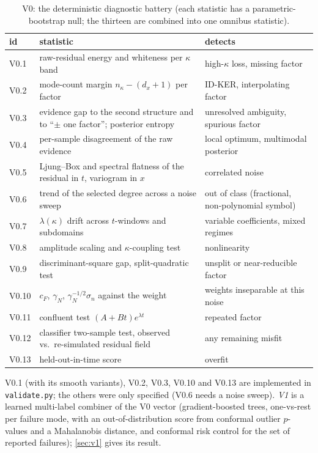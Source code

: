 \documentclass[11pt]{article}
\theoremstyle{plain}
\theoremstyle{definition}
\theoremstyle{remark}
\newcommand{\cF}{c_{F}}                     %
\newcommand{\gN}{\gamma_{N}}                %
\newcommand{\noise}{\sigma_{n}}             %
\begin{document}
\begin{table}[tbp]
\centering\small
\caption{V0: the deterministic diagnostic battery (each statistic has a parametric-bootstrap null; the thirteen are combined into one omnibus statistic).}\label{tab:v0}
\begin{tabular}{@{}p{0.9cm}p{6.2cm}p{4.6cm}@{}}
\toprule
id & statistic & detects\\
\midrule
V0.1 & raw-residual energy and whiteness per $\kappa$ band & high-$\kappa$ loss, missing factor\\
V0.2 & mode-count margin $n_\kappa-(d_x+1)$ per factor & ID-KER, interpolating factor\\
V0.3 & evidence gap to the second structure and to ``$\pm$ one factor''; posterior entropy & unresolved ambiguity, spurious factor\\
V0.4 & per-sample disagreement of the raw evidence & local optimum, multimodal posterior\\
V0.5 & Ljung--Box and spectral flatness of the residual in $t$, variogram in $x$ & correlated noise\\
V0.6 & trend of the selected degree across a noise sweep & out of class (fractional, non-polynomial symbol)\\
V0.7 & $\lambda(\kappa)$ drift across $t$-windows and subdomains & variable coefficients, mixed regimes\\
V0.8 & amplitude scaling and $\kappa$-coupling test & nonlinearity\\
V0.9 & discriminant-square gap, split-quadratic test & unsplit or near-reducible factor\\
V0.10 & $\cF$, $\gN$, $\gN^{-1/2}\noise$ against the weight & weights inseparable at this noise\\
V0.11 & confluent test $(A+Bt)e^{\lambda t}$ & repeated factor\\
V0.12 & classifier two-sample test, observed vs.\ re-simulated residual field & any remaining misfit\\
V0.13 & held-out-in-time score & overfit\\
\bottomrule
\end{tabular}
\end{table}
V0.1 (with its smooth variants), V0.2, V0.3, V0.10 and V0.13 are implemented in \texttt{validate.py}; the others were only specified (V0.6 needs a noise sweep). \emph{V1} is a learned multi-label combiner of the V0 vector (gradient-boosted trees, one-vs-rest per failure mode, with an out-of-distribution score from conformal outlier $p$-values and a Mahalanobis distance, and conformal risk control for the set of reported failures); \cref{sec:v1} gives its result.
\end{document}
